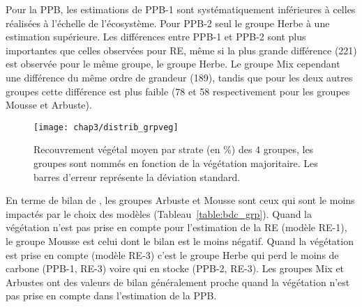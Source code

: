 Pour la PPB, les estimations de PPB-1 sont systématiquement inférieures à celles réalisées à l'échelle de l'écosystème.
Pour PPB-2 seul le groupe Herbe à une estimation supérieure.
Les différences entre PPB-1 et PPB-2 sont plus importantes que celles observées pour RE, même si la plus grande différence (\num{221}) est observée pour le même groupe, le groupe Herbe.
Le groupe Mix cependant une différence du même ordre de grandeur (\num{189}), tandis que pour les deux autres groupes cette différence est plus faible (78 et 58 respectivement pour les groupes Mousse et Arbuste).

\begin{figure}
\centering
\texttt{[image: chap3/distrib\_grpveg]}
\caption{Recouvrement végétal moyen par strate (en \si{\percent}) des 4 groupes, les groupes sont nommés en fonction de la végétation majoritaire. Les barres d'erreur représente la déviation standard.}
\label{fig:distrib_grpveg}
\end{figure}

En terme de bilan de \coo, les groupes Arbuste et Mousse sont ceux qui sont le moins impactés par le choix des modèles (Tableau~\ref{table:bdc_grp}).
Quand la végétation n'est pas prise en compte pour l'estimation de la RE (modèle RE-1), le groupe Mousse est celui dont le bilan est le moins négatif.
Quand la végétation est prise en compte (modèle RE-3) c'est le groupe Herbe qui perd le moins de carbone (PPB-1, RE-3) voire qui en stocke (PPB-2, RE-3).
Les groupes Mix et Arbustes ont des valeurs de bilan généralement proche quand la végétation n'est pas prise en compte dans l'estimation de la PPB.




